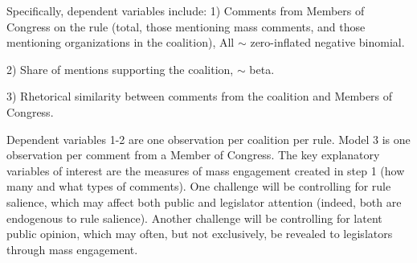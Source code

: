 Specifically, dependent variables include:
1) Comments from Members of Congress on the rule (total, those mentioning mass comments, and those mentioning organizations in the coalition), All  $\sim$ zero-inflated negative binomial. 

2) Share of mentions supporting the coalition,  $\sim$  beta. 

3) Rhetorical similarity between comments from the coalition and Members of Congress. 

Dependent variables 1-2 are one observation per coalition per rule. Model 3 is one observation per comment from a Member of Congress. The key explanatory variables of interest are the measures of mass engagement created in step 1 (how many and what types of comments). One challenge will be controlling for rule salience, which may affect both public and legislator attention (indeed, both are endogenous to rule salience). Another challenge will be controlling for latent public opinion, which may often, but not exclusively, be revealed to legislators through mass engagement.%

